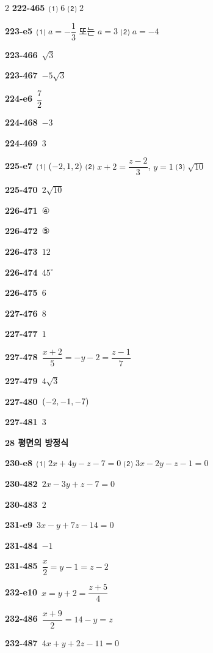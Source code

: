 \documentclass[10pt,a4paper]{article}
\begin{document}
\begin{multicols}{2}
\noindent\textbf{222-465}\ ⑴ $6$ ⑵ $2$\par
\noindent\textbf{223-e5}\ ⑴ $a=-\dfrac{1}{3}$ 또는 $a=3$ ⑵ $a=-4$\par
\noindent\textbf{223-466}\ $\sqrt{3}$\par
\noindent\textbf{223-467}\ $-5\sqrt{3}$\par
\noindent\textbf{224-e6}\ $\dfrac{7}{2}$\par
\noindent\textbf{224-468}\ $-3$\par
\noindent\textbf{224-469}\ $3$\par
\noindent\textbf{225-e7}\ ⑴ $(-2{,}\mkern3mu\mathopen{}1{,}\mkern3mu\mathopen{}2)$ ⑵ $x+2=\dfrac{z-2}{3}$, $y=1$ ⑶ $\sqrt{10}$\par
\noindent\textbf{225-470}\ $2\sqrt{10}$\par
\noindent\textbf{226-471}\ ④\par
\noindent\textbf{226-472}\ ⑤\par
\noindent\textbf{226-473}\ $12$\par
\noindent\textbf{226-474}\ $45^\circ$\par
\noindent\textbf{226-475}\ $6$\par
\noindent\textbf{227-476}\ $8$\par
\noindent\textbf{227-477}\ $1$\par
\noindent\textbf{227-478}\ $\dfrac{x+2}{5}=-y-2=\dfrac{z-1}{7}$\par
\noindent\textbf{227-479}\ $4\sqrt{3}$\par
\noindent\textbf{227-480}\ $(-2{,}\mkern3mu\mathopen{}-1{,}\mkern3mu\mathopen{}-7)$\par
\noindent\textbf{227-481}\ $3$\par
\noindent\textbf{28 평면의 방정식}\par\smallskip
\noindent\textbf{230-e8}\ ⑴ $2x+4y-z-7=0$ ⑵ $3x-2y-z-1=0$\par
\noindent\textbf{230-482}\ $2x-3y+z-7=0$\par
\noindent\textbf{230-483}\ $2$\par
\noindent\textbf{231-e9}\ $3x-y+7z-14=0$\par
\noindent\textbf{231-484}\ $-1$\par
\noindent\textbf{231-485}\ $\dfrac{x}{2}=y-1=z-2$\par
\noindent\textbf{232-e10}\ $x=y+2=\dfrac{z+5}{4}$\par
\noindent\textbf{232-486}\ $\dfrac{x+9}{2}=14-y=z$\par
\noindent\textbf{232-487}\ $4x+y+2z-11=0$\par

\end{multicols}
\end{document}
